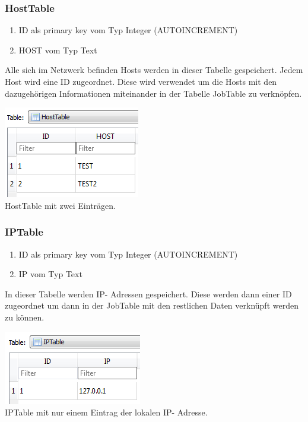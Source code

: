 \documentclass[12pt,a4paper]{report}
\begin{document}
\begin{onehalfspace}
\subsubsection{HostTable}
\begin{enumerate}
\item ID als primary key vom Typ Integer (AUTOINCREMENT)
\item HOST vom Typ Text
\end{enumerate}
Alle sich im Netzwerk befinden Hosts werden in dieser Tabelle gespeichert. Jedem Host wird eine ID zugeordnet. Diese wird verwendet um die Hosts mit den dazugehörigen Informationen miteinander in der Tabelle JobTable zu verknöpfen.
\begin{center}
\includegraphics[scale=0.8]{img/db-tb-host.png}\\
HostTable mit zwei Einträgen.
\end{center}
\subsubsection{IPTable}
\begin{enumerate}
\item ID als primary key vom Typ Integer (AUTOINCREMENT)
\item IP vom Typ Text
\end{enumerate}
In dieser Tabelle werden IP- Adressen gespeichert. Diese werden dann einer ID zugeordnet um dann in der JobTable mit den restlichen Daten verknüpft werden zu können.
\begin{center}
\includegraphics[scale=0.8]{img/db-tb-ip.png}\\
IPTable mit nur einem Eintrag der lokalen IP- Adresse.
\end{center}

\end{onehalfspace}
\end{document}
